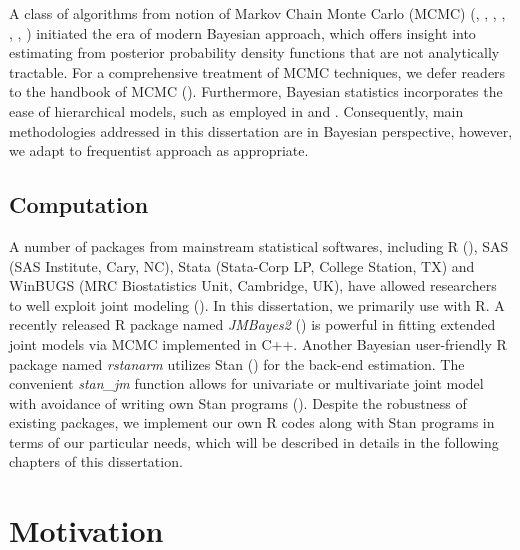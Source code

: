 A class of algorithms from notion of Markov Chain Monte Carlo (MCMC) (\cite{Metropolis1953}, \cite{Hastings1970}, \cite{Geman1984}, \cite{Tanner1987}, \cite{Gelfand1990}, \cite{Geyer1992}, \cite{Tierney1994}) initiated the era of modern Bayesian approach, which offers insight into estimating from posterior probability density functions that are not analytically tractable. For a comprehensive treatment of MCMC techniques, we defer readers to the handbook of MCMC (\cite{handbook2011}). Furthermore, Bayesian statistics incorporates the ease of hierarchical models, such as employed in \cite{Luo2014} and \cite{Brilleman2019}. Consequently, main methodologies addressed in this dissertation are in Bayesian perspective, however, we adapt to frequentist approach as appropriate.

\subsection{Computation}

A number of packages from mainstream statistical softwares, including R (\cite{R2020}), SAS (SAS Institute, Cary, NC), Stata (Stata-Corp LP, College Station, TX) and WinBUGS (MRC Biostatistics Unit, Cambridge, UK), have allowed researchers to well exploit joint modeling (\cite{Hickey2016}). In this dissertation, we primarily use with R. A recently released R package named \emph{JMBayes2} (\cite{Rizopoulos2022}) is powerful in fitting extended joint models via MCMC implemented in C++. Another Bayesian user-friendly R package named \emph{rstanarm} utilizes Stan (\cite{Goodrich2020}) for the back-end estimation. The convenient \emph{stan\_jm} function allows for univariate or multivariate joint model with avoidance of writing own Stan programs (\cite{Brilleman2018}). Despite the robustness of existing packages, we implement our own R codes along with Stan programs in terms of our particular needs, which will be described in details in the following chapters of this dissertation. 


\section{Motivation}

